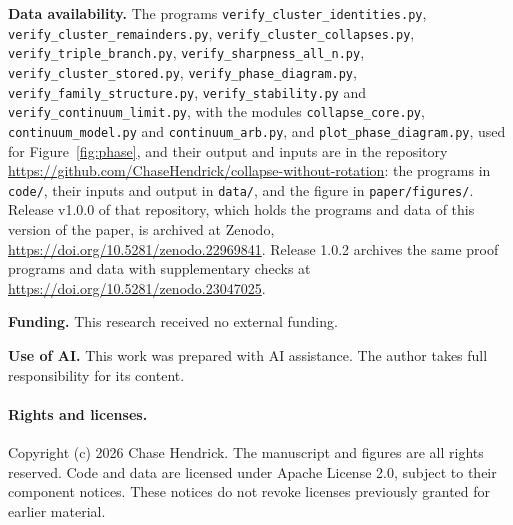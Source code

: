 \documentclass[11pt]{article}
\theoremstyle{definition}
\begin{document}
\medskip
{\raggedright\noindent\textbf{Data availability.} The programs \texttt{verify\_\allowbreak cluster\_\allowbreak identities.py}, \texttt{verify\_\allowbreak cluster\_\allowbreak remainders.py}, \texttt{verify\_\allowbreak cluster\_\allowbreak collapses.py}, \texttt{verify\_\allowbreak triple\_\allowbreak branch.py}, \texttt{verify\_\allowbreak sharpness\_\allowbreak all\_\allowbreak n.py}, \texttt{verify\_\allowbreak cluster\_\allowbreak stored.py}, \texttt{verify\_\allowbreak phase\_\allowbreak diagram.py}, \texttt{verify\_\allowbreak family\_\allowbreak structure.py}, \texttt{verify\_\allowbreak stability.py} and \texttt{verify\_\allowbreak continuum\_\allowbreak limit.py}, with the modules \texttt{collapse\_\allowbreak core.py}, \texttt{continuum\_\allowbreak model.py} and \texttt{continuum\_\allowbreak arb.py}, and \texttt{plot\_\allowbreak phase\_\allowbreak diagram.py}, used for Figure~\ref{fig:phase}, and their output and inputs are in the repository \url{https://github.com/ChaseHendrick/collapse-without-rotation}: the programs in \texttt{code/}, their inputs and output in \texttt{data/}, and the figure in \texttt{paper/figures/}. Release v1.0.0 of that repository, which holds the programs and data of this version of the paper, is archived at Zenodo, \url{https://doi.org/10.5281/zenodo.22969841}. Release 1.0.2 archives the same proof programs and data with supplementary checks at \url{https://doi.org/10.5281/zenodo.23047025}.\par}

\noindent\textbf{Funding.} This research received no external funding.

\noindent\textbf{Use of AI.} This work was prepared with AI assistance. The author takes full responsibility for its content.

\paragraph{Rights and licenses.}
Copyright (c) 2026 Chase Hendrick. The manuscript and figures are all rights reserved. Code and data are licensed under Apache License 2.0, subject to their component notices. These notices do not revoke licenses previously granted for earlier material.
\end{document}
